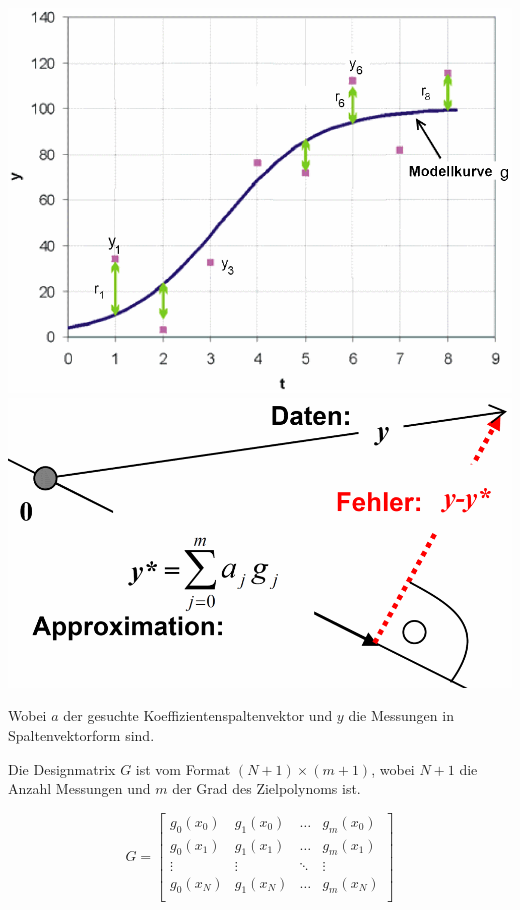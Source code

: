 \begin{minipage}[c]{6.5cm}
\includegraphics[width=\textwidth]{bilder/leastSquare}\\

\includegraphics[width=1\textwidth,trim=-3cm 0cm 0cm 0cm]{bilder/leastSquareOrth}
\end{minipage}

Wobei $a$ der gesuchte Koeffizientenspaltenvektor und $y$ die Messungen in Spaltenvektorform sind.

Die Designmatrix $G$ ist vom Format $(N+1) \times (m+1)$, wobei $N+1$ die Anzahl Messungen und $m$ der Grad des 
Zielpolynoms ist.

$$G = \begin{bmatrix}
  g_0(x_0) & g_1(x_0) & \ldots & g_m(x_0)\\
  g_0(x_1) & g_1(x_1) & \ldots & g_m(x_1)\\
  \vdots   & \vdots   & \ddots & \vdots\\
  g_0(x_N) & g_1(x_N) & \ldots & g_m(x_N)\\
\end{bmatrix}$$


